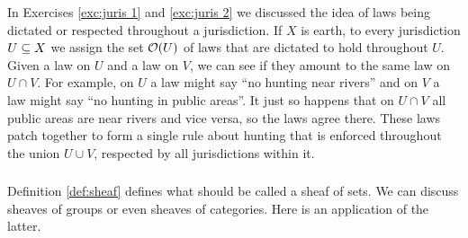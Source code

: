 \documentclass[CT4S-EN-RU]{subfiles}
\begin{document}
\begin{example}

In Exercises \ref{exc:juris 1} and \ref{exc:juris 2} we discussed the idea of laws being dictated or respected throughout a jurisdiction. If $X$ is earth, to every jurisdiction $U\ss X$ we assign the set $\mcO(U)$ of laws that are dictated to hold throughout $U$. Given a law on $U$ and a law on $V$, we can see if they amount to the same law on $U\cap V$. For example, on $U$ a law  might say “no hunting near rivers” and on $V$ a law might say “no hunting in public areas”. It just so happens that on $U\cap V$ all public areas are near rivers and vice versa, so the laws agree there. These laws patch together to form a single rule about hunting that is enforced throughout the union $U\cup V$, respected by all jurisdictions within it.

\end{example}


\subsubsection{}

Definition \ref{def:sheaf} defines what should be called a sheaf of sets. We can discuss sheaves of groups or even sheaves of categories. Here is an application of the latter.
\end{document}

